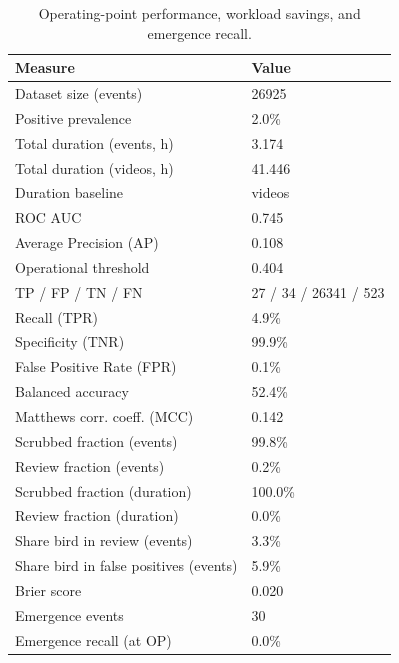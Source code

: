 \begin{table}
\caption{Operating-point performance, workload savings, and emergence recall.}
\label{tab:summary}
\begin{tabular}{ll}
\toprule
Measure & Value \\
\midrule
Dataset size (events) & 26925 \\
Positive prevalence & 2.0\% \\
Total duration (events, h) & 3.174 \\
Total duration (videos, h) & 41.446 \\
Duration baseline & videos \\
ROC AUC & 0.745 \\
Average Precision (AP) & 0.108 \\
Operational threshold & 0.404 \\
TP / FP / TN / FN & 27 / 34 / 26341 / 523 \\
Recall (TPR) & 4.9\% \\
Specificity (TNR) & 99.9\% \\
False Positive Rate (FPR) & 0.1\% \\
Balanced accuracy & 52.4\% \\
Matthews corr. coeff. (MCC) & 0.142 \\
Scrubbed fraction (events) & 99.8\% \\
Review fraction (events) & 0.2\% \\
Scrubbed fraction (duration) & 100.0\% \\
Review fraction (duration) & 0.0\% \\
Share bird in review (events) & 3.3\% \\
Share bird in false positives (events) & 5.9\% \\
Brier score & 0.020 \\
Emergence events & 30 \\
Emergence recall (at OP) & 0.0\% \\
\bottomrule
\end{tabular}
\end{table}
